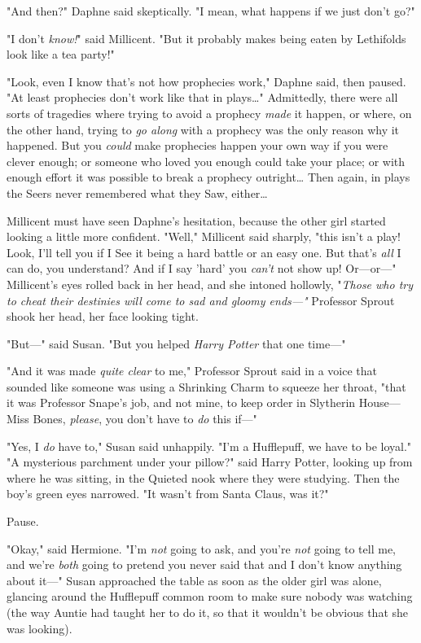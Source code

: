 "And then?" Daphne said skeptically. "I mean, what happens if we just don't go?"

"I don't \emph{know!}" said Millicent. "But it probably makes being eaten by 
Lethifolds look like a tea party!"

"Look, even I know that's not how prophecies work," Daphne said, then paused. 
"At least prophecies don't work like that in plays{\ldots}" Admittedly, there 
were all sorts of tragedies where trying to avoid a prophecy \emph{made} it 
happen, or where, on the other hand, trying to \emph{go along} with a prophecy 
was the only reason why it happened. But you \emph{could} make prophecies 
happen your own way if you were clever enough; or someone who loved you enough 
could take your place; or with enough effort it was possible to break a 
prophecy outright{\ldots} Then again, in plays the Seers never remembered what 
they Saw, either{\ldots}

Millicent must have seen Daphne's hesitation, because the other girl started 
looking a little more confident. "Well," Millicent said sharply, "this isn't a 
play! Look, I'll tell you if I See it being a hard battle or an easy one. But 
that's \emph{all} I can do, you understand? And if I say 'hard' you 
\emph{can't} not show up! Or---or---" Millicent's eyes rolled back in her head, 
and she intoned hollowly, "\emph{Those who try to cheat their destinies will 
come to sad and gloomy ends---"}
\sbreak
Professor Sprout shook her head, her face looking tight.

"But---" said Susan. "But you helped \emph{Harry Potter} that one time---"

"And it was made \emph{quite clear} to me," Professor Sprout said in a voice 
that sounded like someone was using a Shrinking Charm to squeeze her throat, 
"that it was Professor Snape's job, and not mine, to keep order in Slytherin 
House---Miss Bones, \emph{please}, you don't have to \emph{do} this if---"

"Yes, I \emph{do} have to," Susan said unhappily. "I'm a Hufflepuff, we have to 
be loyal."
\sbreak
"A mysterious parchment under your pillow?" said Harry Potter, looking up from 
where he was sitting, in the Quieted nook where they were studying. Then the 
boy's green eyes narrowed. "It wasn't from Santa Claus, was it?"

Pause.

"Okay," said Hermione. "I'm \emph{not} going to ask, and you're \emph{not} 
going to tell me, and we're \emph{both} going to pretend you never said that 
and I don't know anything about it---"
\sbreak
Susan approached the table as soon as the older girl was alone, glancing around 
the Hufflepuff common room to make sure nobody was watching (the way Auntie had 
taught her to do it, so that it wouldn't be obvious that she was looking).

